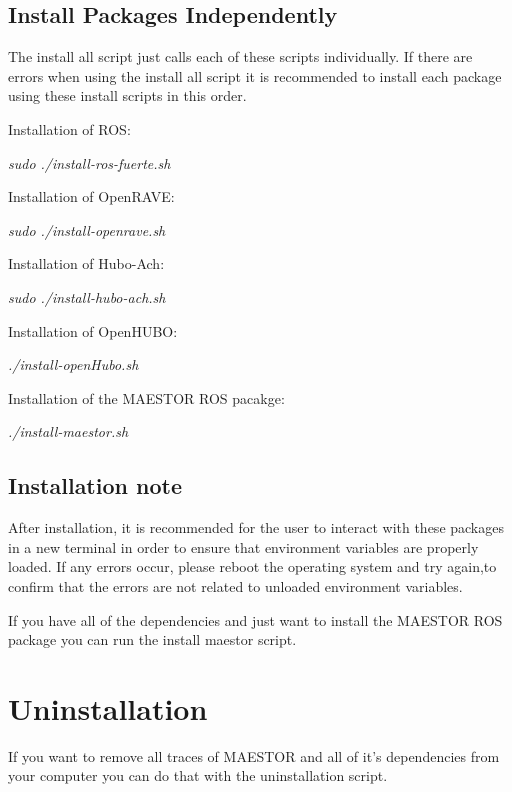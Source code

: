 \documentclass[12pt]{article}
\begin{document}
\subsection{Install Packages Independently}

The install all script just calls each of these scripts individually. If there are errors when using the install all script it is recommended to install each package using these install scripts in this order.  

Installation of ROS:

\begin{center}
	\textit{sudo ./install-ros-fuerte.sh}
\end{center}

Installation of OpenRAVE:
\begin{center}
	\textit{sudo ./install-openrave.sh}
\end{center}

Installation of Hubo-Ach:
\begin{center}
	\textit{	sudo ./install-hubo-ach.sh}
\end{center}
	
Installation of OpenHUBO:
\begin{center}
	\textit{./install-openHubo.sh}
\end{center}

Installation of the MAESTOR ROS pacakge:
\begin{center}
	\textit{./install-maestor.sh}
\end{center}
	
\subsection{Installation note}

After installation, it is recommended for the user to interact with these packages in a new terminal in order to ensure that environment variables are properly loaded. If any errors occur, please reboot the operating system and try again,to confirm that the errors are not related to unloaded environment variables.

If you have all of the dependencies and just want to install the MAESTOR ROS package you can run the install maestor script. 

	
\section{Uninstallation}

If you want to remove all traces of MAESTOR and all of it's dependencies from your computer you can do that with the uninstallation script.
\end{document}

